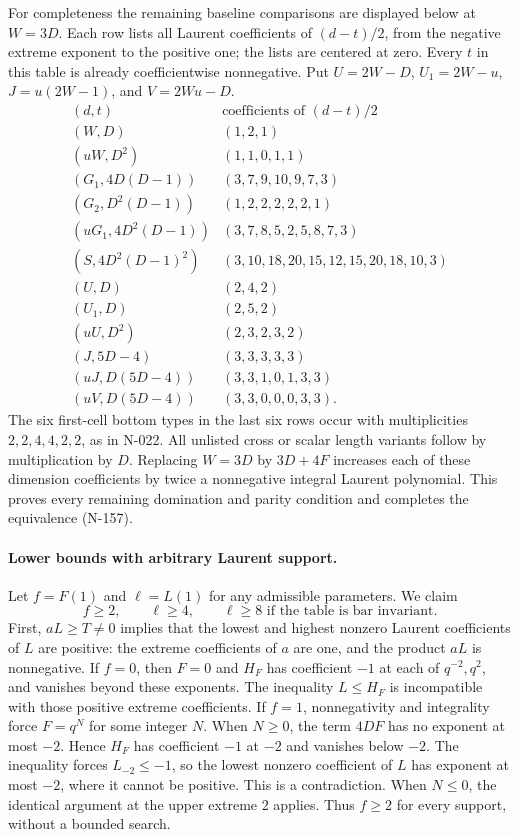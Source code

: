 For completeness the remaining baseline comparisons are displayed
below at $W=3D$.  Each row lists all Laurent coefficients of
$(d-t)/2$, from the negative extreme exponent to the positive one;
the lists are centered at zero.  Every $t$ in this table is already
coefficientwise nonnegative.  Put
$U=2W-D$, $U_1=2W-u$, $J=u(2W-1)$, and $V=2Wu-D$.
\[
\begin{array}{c|l}
 (d,t)&\text{coefficients of }(d-t)/2\\\hline
 (W,D)&(1,2,1)\\
 (uW,D^2)&(1,1,0,1,1)\\
 (G_1,4D(D-1))&(3,7,9,10,9,7,3)\\
 (G_2,D^2(D-1))&(1,2,2,2,2,2,1)\\
 (uG_1,4D^2(D-1))&(3,7,8,5,2,5,8,7,3)\\
 (S,4D^2(D-1)^2)&(3,10,18,20,15,12,15,20,18,10,3)\\
 (U,D)&(2,4,2)\\
 (U_1,D)&(2,5,2)\\
 (uU,D^2)&(2,3,2,3,2)\\
 (J,5D-4)&(3,3,3,3,3)\\
 (uJ,D(5D-4))&(3,3,1,0,1,3,3)\\
 (uV,D(5D-4))&(3,3,0,0,0,3,3).
\end{array}\tag{N-158}
\]
The six first-cell bottom types in the last six rows occur with
multiplicities $2,2,4,4,2,2$, as in N-022.  All unlisted cross
or scalar length variants follow by multiplication by $D$.
Replacing $W=3D$ by $3D+4F$ increases each of these dimension
coefficients by twice a nonnegative integral Laurent polynomial.
This proves every remaining domination and parity condition and
completes the equivalence (N-157).

\paragraph{Lower bounds with arbitrary Laurent support.}
Let $f=F(1)$ and $\ell=L(1)$ for any admissible parameters.
We claim
\[
             f\ge2,\qquad \ell\ge4,
       \qquad \ell\ge8\text{ if the table is bar invariant}.
             \tag{N-159}
\]
First, $aL\ge T\ne0$ implies that the lowest and highest nonzero
Laurent coefficients of $L$ are positive: the extreme coefficients
of $a$ are one, and the product $aL$ is nonnegative.
If $f=0$, then $F=0$ and $H_F$ has coefficient $-1$ at each
of $q^{-2},q^2$, and vanishes beyond these exponents.  The inequality
$L\le H_F$ is incompatible with those positive extreme coefficients.
If $f=1$, nonnegativity and integrality force $F=q^N$ for some integer
$N$.  When $N\ge0$, the term $4DF$ has no exponent at most $-2$.
Hence $H_F$ has coefficient $-1$ at $-2$ and vanishes below $-2$.
The inequality forces $L_{-2}\le-1$, so the lowest nonzero
coefficient of $L$ has exponent at most $-2$, where it cannot be
positive.  This is a contradiction.  When $N\le0$, the identical
argument at the upper extreme $2$ applies.  Thus $f\ge2$ for every
support, without a bounded search.

